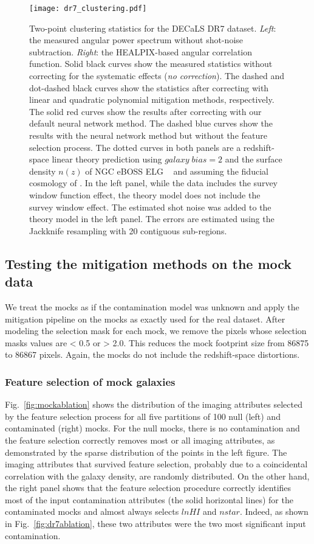 \documentclass[fleqn, usenatbib]{mnras}
\begin{document}
\begin{figure*}
\centering
\texttt{[image: dr7\_clustering.pdf]}
\caption{Two-point clustering statistics for the DECaLS DR7 dataset. \textit{Left}: the measured angular power spectrum without shot-noise subtraction. \textit{Right}: the HEALPIX-based angular correlation function. Solid black curves show the measured statistics without correcting for the systematic effects (\textit{no correction}). The dashed and dot-dashed black curves show the statistics after correcting with linear and quadratic polynomial mitigation methods, respectively. The solid red curves show the results after correcting with our default neural network method. The dashed blue curves show the results with the neural network method but without the feature selection process. The dotted curves in both panels are a redshift-space linear theory prediction using $galaxy\;bias = 2$ and the surface density $n(z)$ of NGC eBOSS ELG ~\citep[Tab. 4 of][]{Raichoor2017MNRAS.471.3955R} and assuming the fiducial cosmology of \citet{ashley2012MNRAS,2012ApJ...761...14H}. In the left panel, while the data includes the survey window function effect, the theory model does not include the survey window effect. The estimated shot noise was added to the theory model in the left panel. The errors are estimated using the Jackknife resampling with 20 contiguous sub-regions.} \label{fig:clxi}
\end{figure*}

\subsection{Testing the mitigation methods on the mock data}
We treat the mocks as if the contamination model was unknown and apply the mitigation pipeline on the mocks as exactly used for the real dataset. After modeling the selection mask for each mock, we remove the pixels whose selection masks values are < 0.5 or > 2.0. This reduces the mock footprint size from 86875 to 86867 pixels. Again, the mocks do not include the redshift-space distortions.

\subsubsection{Feature selection of mock galaxies}
Fig.~\ref{fig:mockablation} shows the distribution of the imaging attributes selected by the feature selection process for all five partitions of 100 null (left) and contaminated (right) mocks. For the null mocks, there is no contamination and the feature selection correctly removes most or all imaging attributes, as demonstrated by the sparse distribution of the points in the left figure. The imaging attributes that survived feature selection, probably due to a coincidental correlation with the galaxy density, are randomly distributed. On the other hand, the right panel shows that the feature selection procedure correctly identifies most of the input contamination attributes (the solid horizontal lines) for the contaminated mocks and almost always selects $lnHI$ and $nstar$. Indeed, as shown in Fig.~\ref{fig:dr7ablation}, these two attributes were the two most significant input contamination.
\end{document}
